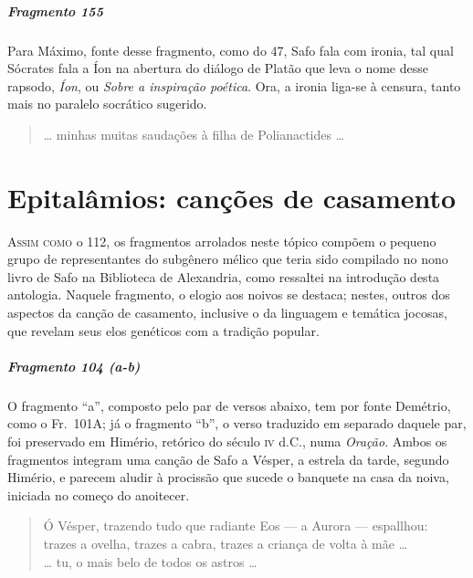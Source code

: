 {\paragraph{Fragmento 155}

{\small Para Máximo, fonte desse fragmento, como do 47, Safo fala com ironia, tal qual
Sócrates fala a Íon na abertura do diálogo de Platão que leva o nome desse
rapsodo, \textit{Íon}, ou \textit{Sobre a inspiração poética}. Ora, a ironia
liga-se à censura, tanto mais no paralelo socrático sugerido.}

\begin{verse}
\ldots{} minhas muitas saudações à filha de \qb{}Polianactides \ldots{}
\end{verse}


\chapter[Epitalâmios: canções de casamento]{Epitalâmios: canções de casamento}

\textsc{Assim como} o 112, os fragmentos arrolados neste tópico compõem o pequeno grupo
de representantes do subgênero mélico que teria sido compilado no nono livro de
Safo na Biblioteca de Alexandria, como ressaltei na introdução desta antologia.
Naquele fragmento, o elogio aos noivos se destaca; nestes, outros dos aspectos
da canção de casamento, inclusive o da linguagem e temática jocosas, que
revelam seus elos genéticos com a tradição popular.

\paragraph{Fragmento 104 (a-b)}

{\small O fragmento “a”, composto pelo par de versos abaixo, tem por fonte Demétrio,
como o Fr.~101A; já o fragmento “b”, o verso traduzido em separado daquele par,
foi preservado em Himério, retórico do século \textsc{iv} d.C., numa \textit{Oração}.
Ambos os fragmentos integram uma canção de Safo a Vésper, a estrela da tarde,
segundo Himério, e parecem aludir à procissão que sucede o banquete na casa da
noiva, iniciada no começo do anoitecer.}

\begin{verse}
Ó Vésper, trazendo tudo que radiante Eos --- a \qb{}Aurora --- espallhou:\\ %
trazes a ovelha, trazes a cabra, trazes a criança de \qb{}volta à mãe \ldots{}\\
\ldots{} tu, o mais belo de todos os astros \ldots{} 
\end{verse}


}
